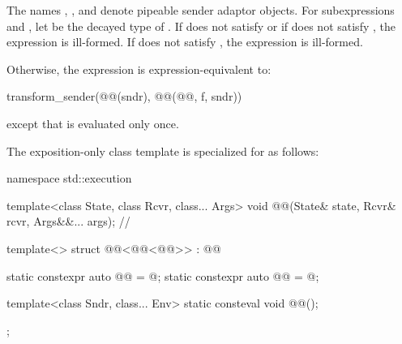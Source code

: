\pnum
The names , , and  denote
pipeable sender adaptor objects.
For subexpressions  and ,
let  be the decayed type of .
If  does not satisfy  or
if  does not satisfy ,
the expression  is ill-formed.
If  does not satisfy ,
the expression  is ill-formed.

\pnum
Otherwise,
the expression  is expression-equivalent to:
\begin{codeblock}
transform_sender(@@(sndr), @@(@@, f, sndr))
\end{codeblock}
except that  is evaluated only once.

\pnum
The exposition-only class template 
is specialized for  as follows:
\begin{codeblock}
namespace std::execution {
  template<class State, class Rcvr, class... Args>
  void @@(State& state, Rcvr& rcvr, Args&&... args);      // \expos

  template<>
  struct @@<@@<@@>> : @@ {
    static constexpr auto @@ = @\seebelow@;
    static constexpr auto @@ = @\seebelow@;

    template<class Sndr, class... Env>
      static consteval void @@();
  };
}
\end{codeblock}

